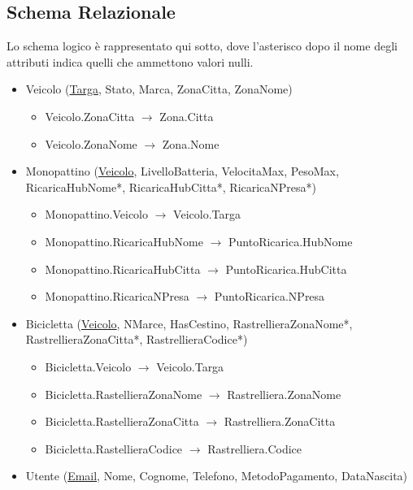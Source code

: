 \documentclass[11pt,a4paper]{article}
\begin{document}
\subsection{Schema Relazionale}
Lo schema logico è rappresentato qui sotto, dove l’asterisco dopo il nome degli attributi indica quelli che ammettono valori nulli.
\begin{itemize}
    \item Veicolo (\underline{Targa}, Stato, Marca, ZonaCitta, ZonaNome)
          \begin{itemize}
              \item Veicolo.ZonaCitta $\to$ Zona.Citta
              \item Veicolo.ZonaNome $\to$ Zona.Nome
          \end{itemize}

    \item Monopattino (\underline{Veicolo}, LivelloBatteria, VelocitaMax, PesoMax, RicaricaHubNome*, RicaricaHubCitta*, RicaricaNPresa*)
          \begin{itemize}
              \item Monopattino.Veicolo $\to$ Veicolo.Targa
              \item Monopattino.RicaricaHubNome $\to$ PuntoRicarica.HubNome
              \item Monopattino.RicaricaHubCitta $\to$ PuntoRicarica.HubCitta
              \item Monopattino.RicaricaNPresa $\to$ PuntoRicarica.NPresa
          \end{itemize}

    \item Bicicletta (\underline{Veicolo}, NMarce, HasCestino, RastrellieraZonaNome*, RastrellieraZonaCitta*, RastrellieraCodice*)
          \begin{itemize}
              \item Bicicletta.Veicolo $\to$ Veicolo.Targa
              \item Bicicletta.RastellieraZonaNome $\to$ Rastrelliera.ZonaNome
              \item Bicicletta.RastellieraZonaCitta $\to$ Rastrelliera.ZonaCitta
              \item Bicicletta.RastellieraCodice $\to$ Rastrelliera.Codice
          \end{itemize}

    \item Utente (\underline{Email}, Nome, Cognome, Telefono, MetodoPagamento, DataNascita)


\end{itemize}
\end{document}
